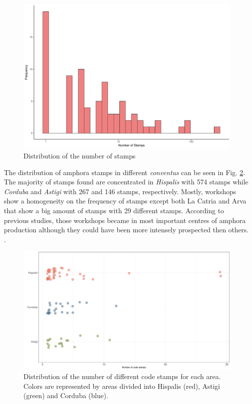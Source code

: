 \documentclass[review]{elsarticle}
\begin{document}
\begin{figure}[htp]
	\centering
\includegraphics[width=\linewidth]{figs/frequencystamp.pdf}
\caption{Distribution of the number of stamps}
\label{stamps}
\end{figure} 


The distribution of amphora stamps in different \textit{conventus} can be seen in Fig. \ref{frequency}. The majority of stamps found are concentrated in \textit{Hispalis} with 574 stamps while \textit{Corduba} and \textit{Astigi} with 267 and 146 stamps, respectively. Mostly, workshops show a homogeneity on the frequency of stamps except both La Catria and Arva that show a big amount of stamps with 29 different stamps. According to previous studies, those workshops became in most important centres of amphora production although they could have been more intensely prospected then others. \citep{arva_1997}.
 
\begin{figure}[htp]
	\centering
\includegraphics[width=\linewidth]{figs/frequency}
\caption{Distribution of the number of different code stamps for each area. Colors are represented by areas divided into Hispalis (red), Astigi (green) and Corduba (blue).}
\label{frequency}
\end{figure} 
\end{document}
